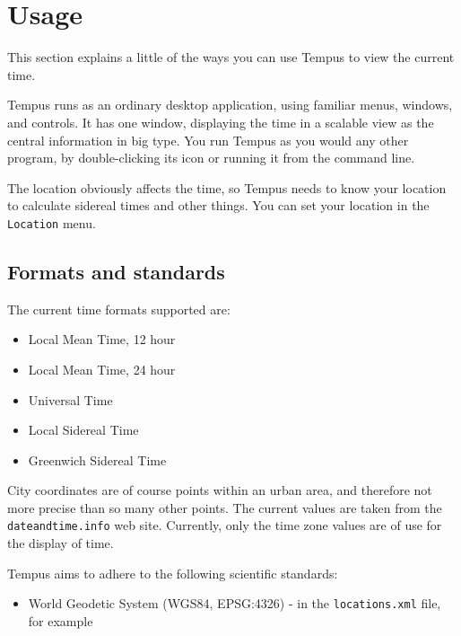 \section{Usage}

This section explains a little of the ways you can use Tempus to view the current time.

Tempus runs as an ordinary desktop application, using familiar menus, windows, and controls. It has one window, displaying the time in a scalable view as the central information in big type.
You run Tempus as you would any other program, by double-clicking its icon or running it from the command line. 

The location obviously affects the time, so Tempus needs to know your location to calculate sidereal times and other things. You can set your location in the \texttt{Location} menu.

\subsection{Formats and standards}

The current time formats supported are:
\begin{itemize}
    \item Local Mean Time, 12 hour
    \item Local Mean Time, 24 hour
    \item Universal Time
    \item Local Sidereal Time
    \item Greenwich Sidereal Time
\end{itemize}

City coordinates are of course points within an urban area, and therefore not more precise than so many other points. The current values are taken from the \texttt{dateandtime.info} web site. Currently, only the time zone values are of use for the display of time.

Tempus aims to adhere to the following scientific standards:

\begin{itemize}
    \item World Geodetic System (WGS84, EPSG:4326) - in the \texttt{locations.xml} file, for example
\end{itemize}

